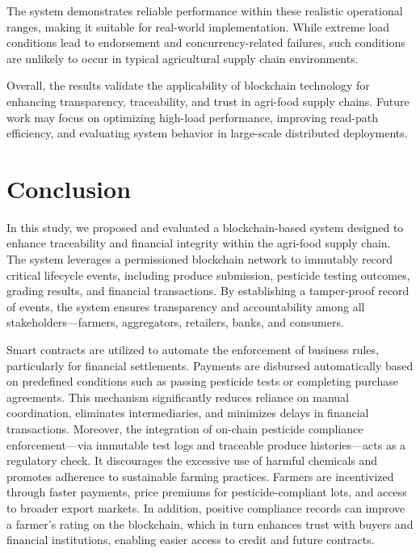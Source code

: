 \documentclass[12pt]{article}
\begin{document}
	The system demonstrates reliable performance within these realistic operational ranges, making it suitable for real-world implementation. While extreme load conditions lead to endorsement and concurrency-related failures, such conditions are unlikely to occur in typical agricultural supply chain environments.
	
	Overall, the results validate the applicability of blockchain technology for enhancing transparency, traceability, and trust in agri-food supply chains. Future work may focus on optimizing high-load performance, improving read-path efficiency, and evaluating system behavior in large-scale distributed deployments.
	
	\section{Conclusion}
	
	In this study, we proposed and evaluated a blockchain-based system designed to enhance traceability and financial integrity within the agri-food supply chain. The system leverages a permissioned blockchain network to immutably record critical lifecycle events, including produce submission, pesticide testing outcomes, grading results, and financial transactions. By establishing a tamper-proof record of events, the system ensures transparency and accountability among all stakeholders—farmers, aggregators, retailers, banks, and consumers.
	
	Smart contracts are utilized to automate the enforcement of business rules, particularly for financial settlements. Payments are disbursed automatically based on predefined conditions such as passing pesticide tests or completing purchase agreements. This mechanism significantly reduces reliance on manual coordination, eliminates intermediaries, and minimizes delays in financial transactions. Moreover, the integration of on-chain pesticide compliance enforcement—via immutable test logs and traceable produce histories—acts as a regulatory check. It discourages the excessive use of harmful chemicals and promotes adherence to sustainable farming practices. Farmers are incentivized through faster payments, price premiums for pesticide-compliant lots, and access to broader export markets. In addition, positive compliance records can improve a farmer’s rating on the blockchain, which in turn enhances trust with buyers and financial institutions, enabling easier access to credit and future contracts.
	
\end{document}
